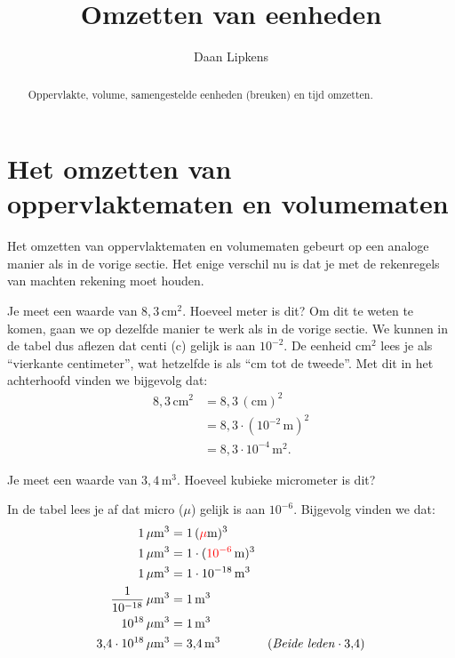 \documentclass{ximera}
\title{Omzetten van eenheden}
\author{Daan Lipkens}
\begin{document}
\begin{abstract}
    Oppervlakte, volume, samengestelde eenheden (breuken) en tijd omzetten.
\end{abstract}
\maketitle

\section{Het omzetten van oppervlaktematen en volumematen}
Het omzetten van oppervlaktematen en volumematen gebeurt op een analoge manier als in de vorige sectie. Het enige verschil nu is dat je met de rekenregels van machten rekening moet houden.

\begin{example}[title={Invullen van prefixen}]\nl
    Je meet een waarde van $8{,}3 \, \mathrm{cm}^{2}$. Hoeveel meter is dit? Om dit te weten te komen, gaan we op dezelfde manier te werk als in de vorige sectie. We kunnen in de tabel dus aflezen dat centi (c) gelijk is aan $10^{-2}$. De eenheid $\mathrm{cm}^{2}$ lees je als ``vierkante centimeter'', wat hetzelfde is als ``cm tot de tweede''. Met dit in het achterhoofd vinden we bijgevolg dat:
    \begin{align*}
    8{,}3 \, \mathrm{cm}^{2} & = 8{,}3 \, (\mathrm{cm})^{2} \\
    & = 8{,}3 \cdot (10^{-2} \, \mathrm{m})^{2} \\
    & = 8{,}3 \cdot 10^{-4} \, \mathrm{m}^{2}.
    \end{align*}
\end{example}

\begin{example}[foldable=true,title={Voorbeeld: kubieke meter omzetten naar kubieke micrometer}]\nl
    Je meet een waarde van $3{,}4 \, \mathrm{m}^{3}$. Hoeveel kubieke micrometer is dit?

    \begin{solution}\nl
    In de tabel lees je af dat micro ($\mu$) gelijk is aan $10^{-6}$. Bijgevolg vinden we dat:
    \begin{align*}
    1 \, \mathrm{\mu m}^{3} & = 1 \, (\textcolor{red}{\mathrm{\mu}}\mathrm{m})^{3} & \\
    1 \, \mathrm{\mu m}^{3} & = 1 \cdot (\textcolor{red}{10^{-6}} \, \mathrm{m})^{3} & \\
    1 \, \mathrm{\mu m}^{3} & = 1 \cdot 10^{-18} \, \mathrm{m}^{3} & \\
    \frac{1}{10^{-18}} \, \mathrm{\mu m}^{3} & = 1 \, \mathrm{m}^{3} & \\
    10^{18} \, \mathrm{\mu m}^{3} & = 1 \, \mathrm{m}^{3} & \\
    3{,}4 \cdot 10^{18} \, \mathrm{\mu m}^{3} & = 3{,}4 \, \mathrm{m}^{3} & (\text{\textit{Beide leden}} \cdot 3{,}4) \\
    \end{align*}
    \end{solution}
\end{example}
\end{document}
